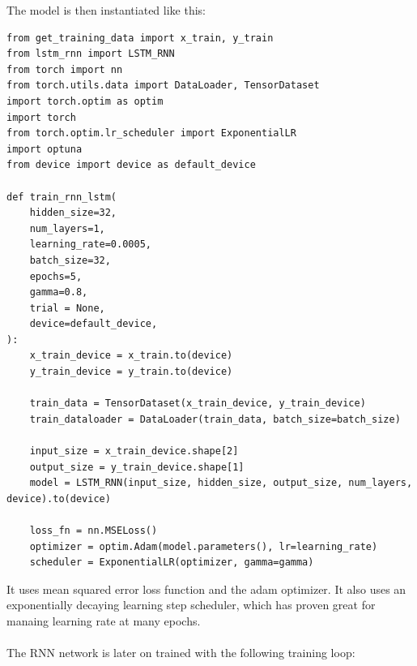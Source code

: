 \documentclass[11pt]{article}
\begin{document}
The model is then instantiated like this:
\begin{lstlisting}
from get_training_data import x_train, y_train
from lstm_rnn import LSTM_RNN
from torch import nn
from torch.utils.data import DataLoader, TensorDataset
import torch.optim as optim
import torch
from torch.optim.lr_scheduler import ExponentialLR
import optuna
from device import device as default_device

def train_rnn_lstm(
    hidden_size=32,
    num_layers=1,
    learning_rate=0.0005,
    batch_size=32,
    epochs=5,
    gamma=0.8,
    trial = None,
    device=default_device,
):
    x_train_device = x_train.to(device)
    y_train_device = y_train.to(device)

    train_data = TensorDataset(x_train_device, y_train_device)
    train_dataloader = DataLoader(train_data, batch_size=batch_size)

    input_size = x_train_device.shape[2]
    output_size = y_train_device.shape[1]
    model = LSTM_RNN(input_size, hidden_size, output_size, num_layers, device).to(device)

    loss_fn = nn.MSELoss()
    optimizer = optim.Adam(model.parameters(), lr=learning_rate)
    scheduler = ExponentialLR(optimizer, gamma=gamma)
\end{lstlisting}

 It uses mean squared error loss function and the adam optimizer. It also uses an exponentially decaying learning step scheduler, which has proven great for manaing learning rate at many epochs. \\ \\  The RNN network is later on trained with the following training loop:
\end{document}

